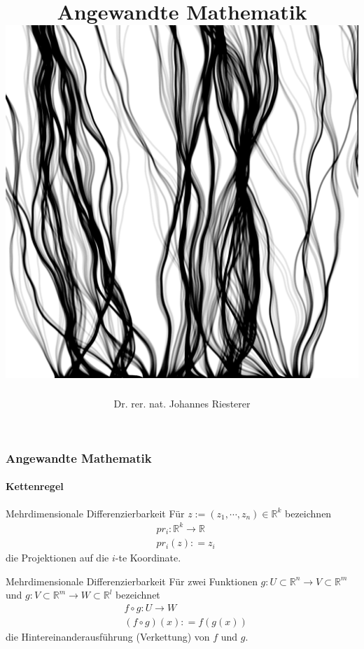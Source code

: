 \documentclass{beamer}
\begin{document}
\title[Angewandte Mathematik] %
{Angewandte Mathematik
\\
\includegraphics[scale=0.15]{images/cover}
}
\subtitle{}
\author[Dr. Johannes Riesterer] %
{Dr.  rer. nat. Johannes Riesterer}

\date[KPT 2004] %
{}

\subject{Angewandte Mathematik}



\begin{frame}
    \frametitle{Angewandte Mathematik}
\framesubtitle{Kettenregel}

    \begin{block}{Mehrdimensionale Differenzierbarkeit}
Für $z:= (z_1, \cdots ,z_n) \in \mathbb{R}^k$ bezeichnen 
\begin{align*}
& pr_i : \mathbb{R}^k \to \mathbb{R} \\
& pr_i(z): = z_i
\end{align*}
die Projektionen auf die $i$-te Koordinate.
\end{block}


    \begin{block}{Mehrdimensionale Differenzierbarkeit}
Für zwei Funktionen  $g: U \subset \mathbb{R}^n \to V  \subset \mathbb{R}^m$ und $g: V \subset \mathbb{R}^m \to W  \subset \mathbb{R}^l$ bezeichnet 
\begin{align*}
& f \circ g: U \to W \\
& (f \circ g)(x) : = f (g(x))
\end{align*}
die Hintereinanderausführung (Verkettung) von $f$ und $g$.
\end{block}

 \end{frame}
\end{document}
